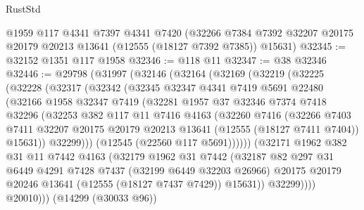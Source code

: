 \begin{lexlean}{RustStd}
\begin{coremodule}
    @1959
    @117
    @4341
    @7397
    @4341
    @7420
    (@32266 @7384 @7392 @32207 @20175 @20179 @20213 @13641 (@12555 (@18127 @7392 @7385)) @15631)
@32345 := @32152 @1351 @117 @1958
@32346 := @118 @11
@32347 := @38 @32346
@32446 := @29798
    (@31997
      (@32146
        (@32164
          (@32169
            (@32219
              (@32225
                (@32228
                  (@32317
                    (@32342
                      (@32345
                        @32347
                        @4341
                        @7419
                        @5691
                        @22480
                        (@32166
                          @1958
                          @32347
                          @7419
                          (@32281
                            @1957
                            @37
                            @32346
                            @7374
                            @7418
                            @32296
                            (@32253
                              @382
                              @117
                              @11
                              @7416
                              @4163
                              (@32260
                                @7416
                                (@32266
                                  @7403
                                  @7411
                                  @32207
                                  @20175
                                  @20179
                                  @20213
                                  @13641
                                  (@12555 (@18127 @7411 @7404))
                                  @15631))
                              @32299)))
                        (@12545 (@22560 @117 @5691))))))
                (@32171
                  @1962
                  @382
                  @31
                  @11
                  @7442
                  @4163
                  (@32179
                    @1962
                    @31
                    @7442
                    (@32187
                      @82
                      @297
                      @31
                      @6449
                      @4291
                      @7428
                      @7437
                      (@32199 @6449 @32203 @26966)
                      @20175
                      @20179
                      @20246
                      @13641
                      (@12555 (@18127 @7437 @7429))
                      @15631))
                  @32299))))
          @20010)))
    (@14299 (@30033 @96))

\end{coremodule}
\end{lexlean}
